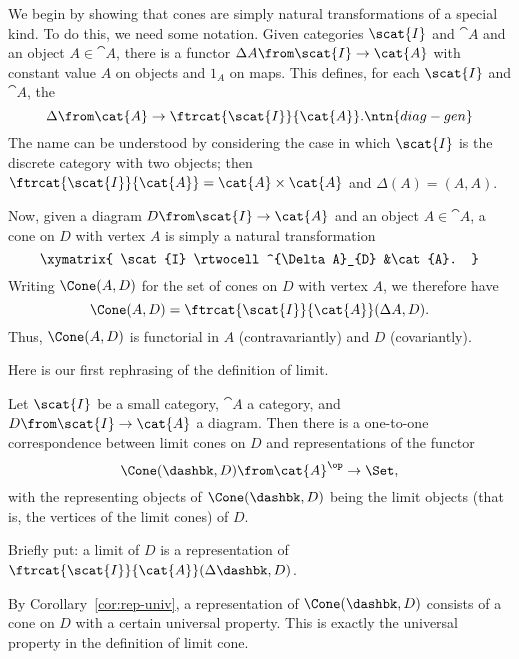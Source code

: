 We begin by showing that cones are simply natural transformations of a
special kind.  To do this, we need some notation.  Given categories
$\scat{I}$ and $\cat{A}$ and an object $A \in \cat{A}$, there is a functor
$\Delta A\from \scat{I} \to \cat{A}$ with constant value $A$ on objects and
$1_A$ on maps.  This defines, for each $\scat{I}$ and $\cat{A}$, the
\[
\Delta\from \cat{A} \to \ftrcat{\scat{I}}{\cat{A}}.%
%
\ntn{diag-gen}
%
\]
The name can be understood by considering the case in which $\scat{I}$ is the
discrete category with two objects; then $\ftrcat{\scat{I}}{\cat{A}} = \cat{A}
\times \cat{A}$ and $\Delta(A) = (A, A)$.

Now, given a diagram $D\from \scat{I} \to \cat{A}$ and an object $A \in
\cat{A}$, a cone on $D$ with vertex $A$ is simply%
%
%
a natural transformation
\[
\xymatrix{
\scat{I} \rtwocell^{\Delta A}_{D} &\cat{A}.
}
\]
Writing $\Cone(A, D)$%
%
%
for the set of cones on $D$ with vertex $A$, we therefore have
% 
\begin{equation}        
\label{eq:cones-as-transfs}
\Cone(A, D)
=
\ftrcat{\scat{I}}{\cat{A}} (\Delta A, D).
\end{equation}
% 
Thus, $\Cone(A, D)$ is functorial in $A$ (contravariantly) and $D$
(covariantly).

Here is our first rephrasing of the definition of limit.

\begin{propn}   
\label{propn:lim-rep}
%
%
Let $\scat{I}$ be a small category, $\cat{A}$ a category, and $D\from \scat{I}
\to \cat{A}$ a diagram.  Then there is a one-to-one correspondence between
limit cones on $D$ and representations of the functor
\[
\Cone(\dashbk, D) \from \cat{A}^\op \to \Set,
\]
with the representing objects of \hspace{.05em}$\Cone(\dashbk, D)$ being the
limit objects (that is, the vertices of the limit cones) of $D$.
\end{propn}

Briefly put: a limit of $D$ is a representation of
$\ftrcat{\scat{I}}{\cat{A}}(\Delta\dashbk, D)$. 

\begin{pf}
By Corollary~\ref{cor:rep-univ}, a representation of $\Cone(\dashbk, D)$
consists of a cone on $D$ with a certain universal property.  This is exactly
the universal property in the definition of limit cone.
\end{pf}

